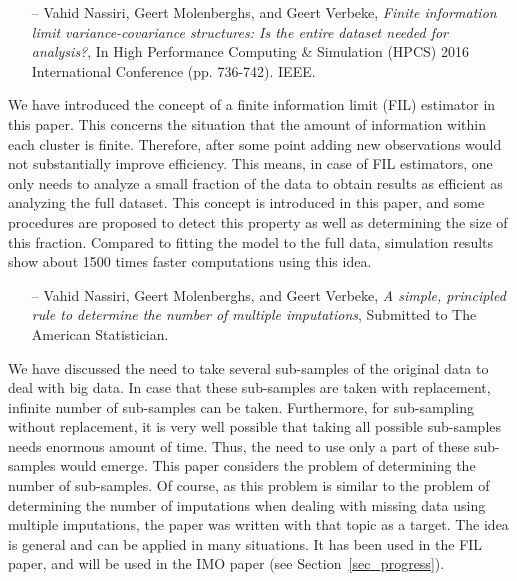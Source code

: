\documentclass[14pt]{article}
\begin{document}
\begin{itemize}
\item[--]{\textsf{Vahid Nassiri, Geert Molenberghs, and Geert Verbeke}}, {\it Finite information limit variance-covariance structures: Is the entire dataset needed for analysis?}, In High Performance Computing \& Simulation (HPCS) 2016 International Conference (pp. 736-742). IEEE.
\end{itemize}
We have introduced the concept of a finite information limit (FIL) estimator in this paper. This concerns the situation that the amount of information within each cluster is finite. Therefore, after some point adding new observations would not substantially improve efficiency. This means, in case of FIL estimators, one only needs to analyze a small fraction of the data to obtain results as efficient as analyzing the full dataset. This concept is introduced in this paper, and some procedures are proposed to detect this property as well as determining the size of this fraction. Compared to fitting the model to the full data, simulation results show about 1500 times faster computations using this idea.


\begin{itemize}
\item[--]{\textsf{Vahid Nassiri, Geert Molenberghs, and Geert Verbeke}}, {\it A simple, principled rule to determine the number of multiple imputations}, Submitted to The American Statistician.
\end{itemize}
We have discussed the need to take several sub-samples of the original data to deal with big data. In case that these sub-samples are taken with replacement, infinite number of sub-samples can be taken. Furthermore, for sub-sampling without replacement, it is very well possible that taking all possible sub-samples needs enormous amount of time. Thus, the need to use only a part of these sub-samples would emerge. This paper considers the problem of determining the number of sub-samples. Of course, as this problem is similar to the problem of determining the number of imputations when dealing with missing data using multiple imputations, the paper was written with that topic as a target. The idea is general and can be applied in many situations. It has been used in the FIL paper, and will be used in the IMO paper (see Section~\ref{sec_progress}).
\end{document}
